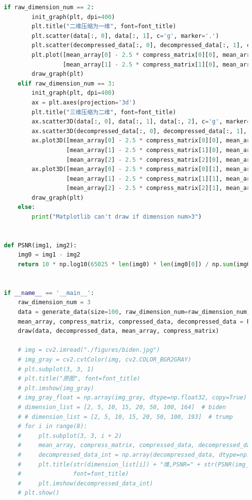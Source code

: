 \documentclass[withoutpreface,bwprint]{cumcmthesis}
\begin{document}
\begin{appendix}
\begin{lstlisting}[language=python]
    if raw_dimension_num == 2:
        init_graph(plt, dpi=400)
        plt.title("二维压缩为一维", font=font_title)
        plt.scatter(data[:, 0], data[:, 1], c='g', marker='.')
        plt.scatter(decompressed_data[:, 0], decompressed_data[:, 1], c='r', marker='.')
        plt.plot([mean_array[0] - 2.5 * compress_matrix[0][0], mean_array[0] + 2.5 * compress_matrix[0][0]],
                 [mean_array[1] - 2.5 * compress_matrix[1][0], mean_array[1] + 2.5 * compress_matrix[1][0]], linewidth=1)
        draw_graph(plt)
    elif raw_dimension_num == 3:
        init_graph(plt, dpi=400)
        ax = plt.axes(projection='3d')
        plt.title("三维压缩为二维", font=font_title)
        ax.scatter3D(data[:, 0], data[:, 1], data[:, 2], c='g', marker='.')
        ax.scatter3D(decompressed_data[:, 0], decompressed_data[:, 1], decompressed_data[:, 2], c='r', marker='.')
        ax.plot3D([mean_array[0] - 2.5 * compress_matrix[0][0], mean_array[0] + 2.5 * compress_matrix[0][0]],
                  [mean_array[1] - 2.5 * compress_matrix[1][0], mean_array[1] + 2.5 * compress_matrix[1][0]],
                  [mean_array[2] - 2.5 * compress_matrix[2][0], mean_array[2] + 2.5 * compress_matrix[2][0]], linewidth=1)
        ax.plot3D([mean_array[0] - 2.5 * compress_matrix[0][1], mean_array[0] + 2.5 * compress_matrix[0][1]],
                  [mean_array[1] - 2.5 * compress_matrix[1][1], mean_array[1] + 2.5 * compress_matrix[1][1]],
                  [mean_array[2] - 2.5 * compress_matrix[2][1], mean_array[2] + 2.5 * compress_matrix[2][1]], linewidth=1)
        draw_graph(plt)
    else:
        print("Matplotlib can't draw if dimension num>3")


def PSNR(img1, img2):
    img0 = img1 - img2
    return 10 * np.log10(65025 * len(img0) * len(img0[0]) / np.sum(img0 ** 2))


if __name__ == '__main__':
    raw_dimension_num = 3
    data = generate_data(size=100, raw_dimension_num=raw_dimension_num)
    mean_array, compress_matrix, compressed_data, decompressed_data = PCA(copy.deepcopy(data), raw_dimension_num - 1)
    draw(data, decompressed_data, mean_array, compress_matrix)

    # img = cv2.imread("./figures/biden.jpg")
    # img_gray = cv2.cvtColor(img, cv2.COLOR_BGR2GRAY)
    # plt.subplot(3, 3, 1)
    # plt.title("原图", font=font_title)
    # plt.imshow(img_gray)
    # img_gray_float = np.array(img_gray, dtype=np.float32, copy=True)
    # dimension_list = [2, 5, 10, 15, 20, 50, 100, 164]  # biden
    # # dimension_list = [2, 5, 10, 15, 20, 50, 100, 193]  # trump
    # for i in range(8):
    #     plt.subplot(3, 3, i + 2)
    #     mean_array, compress_matrix, compressed_data, decompressed_data = PCA(img_gray_float, dimension_list[i])
    #     decompressed_data_int = np.array(decompressed_data, dtype=np.int32, copy=True)
    #     plt.title(str(dimension_list[i]) + "维,PSNR=" + str(PSNR(img_gray_float, np.array(decompressed_data, dtype=np.float32, copy=True))),
    #               font=font_title)
    #     plt.imshow(decompressed_data_int)
    # plt.show()
\end{lstlisting}

\end{appendix}
\end{document}
